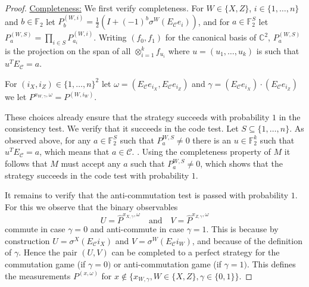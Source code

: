 \documentclass[11pt]{article}
\theoremstyle{definition}
\newcommand{\code}{\mathcal{C}}
\newcommand{\Id}{\ensuremath{I}}
\newcommand{\field}{\mathbb{F}_2}
\newcommand{\C}{\ensuremath{\mathbb{C}}}
\newcommand{\F}{\ensuremath{\mathbb{F}}}
\begin{document}
\begin{proof}
\underline{Completeness:} We first verify completeness. For $W\in\{X,Z\}$, $i\in\{1,\ldots,n\}$ and $b\in \F_2$ let $P^{(W,i)}_b = \frac{1}{2}(\Id + (-1)^b\sigma^W(E_\code e_i))$, and for $a\in \F_2^S$ let $P^{(W,S)}_a = \prod_{i\in S} P^{(W,i)}_{a_i}$. Writing $(f_0,f_1)$ for the canonical basis of $\C^2$, $P^{(W,S)}_a$ is the projection on the span of all $\otimes_{i=1}^k f_{u_i}$ where $u=(u_1,\ldots,u_k)$ is such that $u^T E_\code=a$.   

For $(i_X,i_Z)\in \{1,\ldots,n\}^2 $ let $\omega=(E_\code e_{i_X}, E_\code e_{i_Z})$ and $\gamma =(E_\code e_{i_X}) \cdot(E_\code e_{i_Z}) $ we let $P^{x_{W,\gamma},\omega} = P^{(W,i_W)}$. 

These choices already ensure that the strategy succeeds with probability $1$ in the consistency test. We verify that it succeeds in the code test. Let $S\subseteq\{1,\ldots,n\}$. As observed above, for any $a\in\field^S$ such that $P^{W,S}_a\neq 0$ there is an $u\in \field^k$ such that $u^TE_\code=a$, which means that $a\in \code$. 
. Using the completeness property of $M$ it follows that $M$ must accept any $a$ such that $P^{W,S}_a\neq 0$, which shows that the strategy succeeds in the code test with probability $1$. 

It remains to verify that the anti-commutation test is passed with probability $1$. For this we observe that 
the binary observables 
\[ U=\widehat{ P}^{x_{X,\gamma},\omega} \quad\text{and}\quad V= \widehat{P}^{x_{Z,\gamma},\omega} \]
commute in case $\gamma=0$ and anti-commute in case $\gamma=1$. This is because by construction $U=\sigma^X(E_\code i_X)$ and $V=\sigma^W(E_\code i_W)$, and because of the definition of $\gamma$. Hence the pair $(U,V)$ can be completed to a perfect strategy for the commutation game (if $\gamma=0)$ or anti-commutation game (if $\gamma=1)$. This  defines the measurements $P^{(x,\omega)}$ for $x\notin \{x_{W,\gamma},W\in\{X,Z\},\gamma\in\{0,1\}\}$. 


\end{proof}
\end{document}

